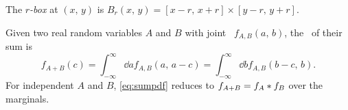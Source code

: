\documentclass[../notebook.tex]{subfiles}
\begin{document}
\begin{defn}
  The \emph{$r$-box} at $(x,\, y)$ is $B_r(x,\, y) = [x - r,\, x + r]
  \times [y - r,\, y + r]$. 
\end{defn}

Given two real random variables $A$ and $B$ with joint \pdf\ $f_{A,B}(a,\, b)$,
the \pdf\ of their sum is
\begin{equation}
  f_{A+B}(c)
  = \int_{-\infty}^\infty \dd{a} f_{A,B}(a,\, a-c)
  = \int_{-\infty}^\infty \dd{b} f_{A,B}(b-c,\, b).
  \label{eq:sumpdf}
\end{equation}
For independent $A$ and $B$, \cref{eq:sumpdf} reduces to $f_{A+B} =
f_A \mathbin{*} f_B$ over the marginals.



\end{document}

